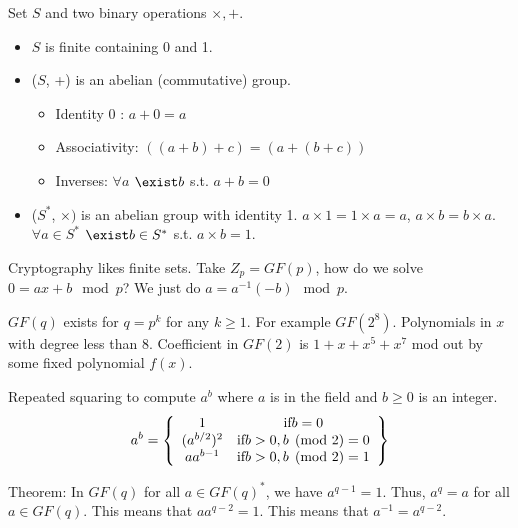 \documentclass[psamsfonts]{amsart}
\begin{document}
Set $S$ and two binary operations $\times, +$.
\begin{itemize}
  \item $S$ is finite containing 0 and 1.
  \item ($S$, +) is an abelian (commutative) group.
    \begin{itemize}
      \item Identity 0 : $a + 0 = a$
      \item Associativity: $((a+b) + c ) = (a + (b+ c))$
      \item Inverses: $\forall a$ $\exist b$ s.t. $a + b = 0$
    \end{itemize}
  \item ($S^*$, $\times)$ is an abelian group with identity 1. $a \times 1 = 1 \times a = a$, $a \times b = b \times a$. $\forall a \in S^*$ $\exist b \in S^{*}$ s.t. $ a \times b = 1$.
\end{itemize}

Cryptography likes finite sets. Take $Z_p = GF(p)$, how do we solve $0 = ax + b \mod p$? We just do $a = a^{-1} (-b) \mod p$.

$GF(q)$ exists for $q = p^k$ for any $k \geq 1$. For example $GF(2^8)$. Polynomials in $x$ with degree less than $8$. Coefficient in $GF(2)$ is $1 + x + x^5 + x^7$ mod out by some fixed polynomial $f(x)$. 

Repeated squaring to compute $a^b$ where $a$ is in the field and $b \geq 0$ is an integer.
\begin{eqnarray}
  a^b = \left\{ \begin{array}{c c}
    1 & \text{if} b = 0 \\
      (a^{b/2})^2 & \text{if} b > 0, b \pmod{2} = 0 \\
        a a^{b-1} & \text{if} b > 0, b \pmod{2} = 1
  \end{array}\right\}
\end{eqnarray}

Theorem: In $GF(q)$ for all $a \in GF(q)^{*}$, we have $a^{q-1} = 1$. Thus, $a^{q} = a$ for all $a \in GF(q)$. This means that $a a^{q-2} = 1$. This means that $a^{-1} = a^{q-2}$. 
\end{document}
